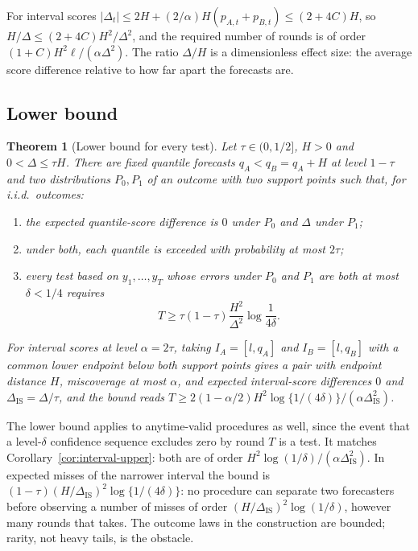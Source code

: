 \documentclass[11pt]{article}
\newtheorem{theorem}{Theorem}
\theoremstyle{remark}
\theoremstyle{definition}
\newcommand{\IS}{\mathrm{IS}}
\begin{document}
For interval scores $|\Delta_t|\le2H+(2/\alpha)H(p_{A,t}+p_{B,t})\le
(2+4C)H$, so $H/\Delta\le(2+4C)H^2/\Delta^2$, and the required number
of rounds is of order $(1+C)H^2\ell/(\alpha\Delta^2)$. The ratio $\Delta/H$ is a dimensionless effect
size: the average score difference relative to how far apart the forecasts
are.

\subsection{Lower bound}

\begin{theorem}[Lower bound for every test]
\label{thm:lower}
Let $\tau\in(0,1/2]$, $H>0$ and $0<\Delta\le\tau H$. There are fixed
quantile forecasts $q_A<q_B=q_A+H$ at level $1-\tau$ and two
distributions $P_0,P_1$ of an outcome with two support points such that, for
i.i.d.\ outcomes:
\begin{enumerate}
\item the expected quantile-score difference is $0$ under $P_0$ and $\Delta$
 under $P_1$;
\item under both, each quantile is exceeded with probability at most
 $2\tau$;
\item every test based on $y_1,\ldots,y_T$ whose errors under $P_0$ and
 $P_1$ are both at most $\delta<1/4$ requires
 \[
  T\ge\tau(1-\tau)\frac{H^2}{\Delta^2}\log\frac1{4\delta}.
 \]
\end{enumerate}
For interval scores at level $\alpha=2\tau$, taking
$I_A=[l,q_A]$ and $I_B=[l,q_B]$ with a common lower endpoint below both
support points gives a pair with endpoint distance $H$, miscoverage at most
$\alpha$, and expected interval-score differences $0$ and
$\Delta_{\IS}=\Delta/\tau$, and the bound reads
$T\ge2(1-\alpha/2)H^2\log\{1/(4\delta)\}/(\alpha\Delta_{\IS}^2)$.
\end{theorem}

The lower bound applies to anytime-valid procedures as well, since the
event that a level-$\delta$ confidence sequence excludes zero by round $T$
is a test. It matches Corollary~\ref{cor:interval-upper}: both are of order
$H^2\log(1/\delta)/(\alpha\Delta_{\IS}^2)$. In expected misses of the narrower
interval the bound is $(1-\tau)(H/\Delta_{\IS})^2\log\{1/(4\delta)\}$: no procedure
can separate two forecasters before observing a number of misses of order
$(H/\Delta_{\IS})^2\log(1/\delta)$, however many rounds that takes. The outcome
laws in the construction are bounded; rarity, not heavy tails, is the
obstacle.
\end{document}
